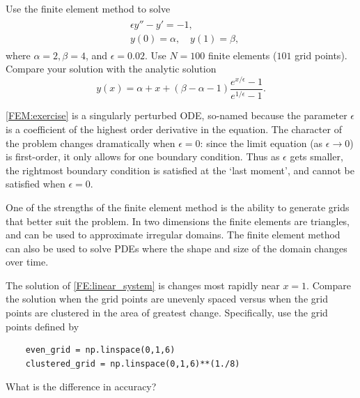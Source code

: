 \begin{problem}
	Use the finite element method to solve
	\begin{align}
		\begin{split}
		&{ }\epsilon y'' - y' = -1,\\
		&{ }y(0) = \alpha, \quad y(1) = \beta,
		\end{split} \label{FEM:exercise}
	\end{align}
	where $\alpha = 2, \beta = 4$, and $\epsilon = 0.02$.  Use $N = 100$ finite elements ($101$ grid points). Compare your solution with the analytic solution
	\[
	y(x) = \alpha + x + (\beta - \alpha - 1 ) \frac{e^{x/\epsilon} -1}{e^{1/\epsilon} -1}.
	\]
	
\eqref{FEM:exercise} is a singularly perturbed ODE, so-named because the parameter $\epsilon$ is a coefficient of the highest order derivative in the equation. The character of the problem changes dramatically when $\epsilon = 0$: since the limit equation (as $\epsilon \to 0$) is first-order, it only allows for one boundary condition. Thus as $\epsilon$ gets smaller, the rightmost boundary condition is satisfied at the `last moment',  and cannot be satisfied when $\epsilon = 0$.
\end{problem}


\begin{problem}
	One of the strengths of the finite element method is the ability to generate grids that better suit the problem. In two dimensions the finite elements are triangles, and can be used to approximate irregular domains.  The finite element method can also be used to solve PDEs where the shape and size of the domain changes over time. 
	
	The solution of \eqref{FE:linear_system} is changes most rapidly near $x = 1$. 
	Compare the solution when the grid points are unevenly spaced versus when the grid points are clustered in the area of greatest change. Specifically, use the grid points defined by 
	\begin{lstlisting}
	even_grid = np.linspace(0,1,6)
	clustered_grid = np.linspace(0,1,6)**(1./8)
	\end{lstlisting}
What is the difference in accuracy? 
\end{problem}



